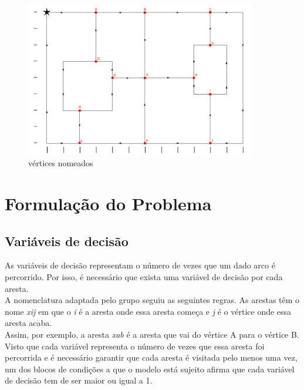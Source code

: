 \documentclass[a4paper]{report}
\begin{document}
\begin{figure}[H]
    \begin{center}
        \includegraphics[width=0.9\textwidth]{images/desafioLetras.png}\par
        \caption{vértices nomeados}
        \label{fig:named}
    \end{center}
\end{figure}

\chapter{Formulação do Problema}

\section{Variáveis de decisão}
As variáveis de decisão representam o número de vezes que um dado arco
é percorrido. Por isso, é necessário que exista uma variável de decisão
por cada aresta.\\
A nomenclatura adaptada pelo grupo seguiu as seguintes regras.
As arestas têm o nome \textit{xij} em que o \textit{i} é a aresta onde
essa aresta começa e \textit{j} é o vértice onde essa aresta acaba.\\
Assim, por exemplo, a aresta \textit{xab} é a aresta que vai do 
vértice A para o vértice B.\\
Visto que cada variável representa o número de vezes que essa aresta
foi percorrida e é necessário garantir que cada aresta é visitada pelo
menos uma vez, um dos blocos de condições a que o modelo está sujeito
afirma que cada variável de decisão tem de ser maior ou igual a 1.
\end{document}
